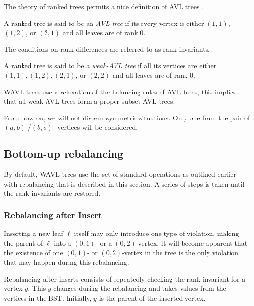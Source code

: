 The theory of ranked trees permits a nice definition of AVL trees \cite{avl}.

\begin{defn}
A ranked tree is said to be an {\em AVL tree} if its every vertex is either $(1,1)$, $(1,2)$, or $(2,1)$ and all leaves are of rank $0$.
\end{defn}

The conditions on rank differences are referred to as rank invariants.

\begin{defn}
A ranked tree is said to be a {\em weak-AVL tree} if all its vertices are either $(1,1), (1,2), (2,1)$, or $(2,2)$ and all leaves are of rank $0$.
\end{defn}

WAVL trees use a relaxation of the balancing rules of AVL trees, this implies that all weak-AVL trees form a proper subset AVL trees.

From now on, we will not discern symmetric situations. Only one from the pair of $(a,b)$-/$(b,a)$- vertices will be considered.

\subsection{Bottom-up rebalancing}

By default, WAVL trees use the set of standard operations as outlined earlier with rebalancing that is described in this section. A series of steps is taken until the rank invariants are restored.


\subsubsection*{Rebalancing after Insert}

Inserting a new leaf $\ell$ itself may only introduce one type of violation, making the parent of $\ell$ into a $(0,1)$- or a $(0,2)$-vertex. It will become apparent that the existence of one $(0,1)$- or $(0,2)$-vertex in the tree is the only violation that may happen during this rebalancing. 

Rebalancing after inserts consists of repeatedly checking the rank invariant for a vertex $y$. This $y$ changes during the rebalancing and takes values from the vertices in the BST. Initially, $y$ is the parent of the inserted vertex. 

